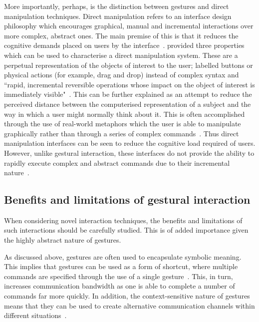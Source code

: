 More importantly, perhaps, is the distinction between gestures and direct manipulation techniques. Direct manipulation refers to an interface design philosophy which encourages graphical, manual and incremental interactions over more complex, abstract ones. The main premise of this is that it reduces the cognitive demands placed on users by the interface~\citep{Froh93}. \citet{Shne82} provided three properties which can be used to characterise a direct manipulation system. These are a perpetual representation of the objects of interest to the user; labelled buttons or physical actions (for example, drag and drop) instead of complex syntax and ``rapid, incremental reversible operations whose impact on the object of interest is immediately visible"~\citep{Froh93}. This can be further explained as an attempt to reduce the perceived distance between the computerised representation of a subject and the way in which a user might normally think about it. This is often accomplished through the use of real-world metaphors which the user is able to manipulate graphically rather than through a series of complex commands~\citep{Hutc85}. Thus direct manipulation interfaces can be seen to reduce the cognitive load required of users. However, unlike gestural interaction, these interfaces do not provide the ability to rapidly execute complex and abstract commands due to their incremental nature~\citep{Froh93}.

\subsection{Benefits and limitations of gestural interaction}
When considering novel interaction techniques, the benefits and limitations of such interactions should be carefully studied. This is of added importance given the highly abstract nature of gestures.

As discussed above, gestures are often used to encapsulate symbolic meaning. This implies that gestures can be used as a form of shortcut, where multiple commands are specified through the use of a single gesture~\citep{Niel04}. This, in turn, increases communication bandwidth as one is able to complete a number of commands far more quickly. In addition, the context-sensitive nature of gestures means that they can be used to create alternative communication channels within different situations~\citep{Jaim07}.

